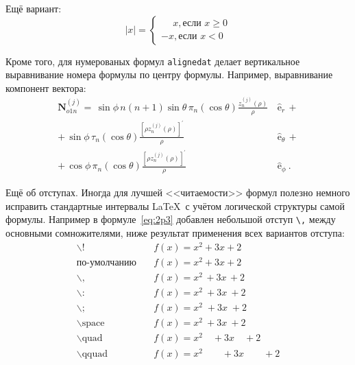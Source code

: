 Ещё вариант:
\[
    |x|=
    \begin{cases}
    \phantom{-}x, \text{если } x \geqslant 0 \\
    -x, \text{если } x<0
    \end{cases}
\]

Кроме того, для  нумерованых формул \verb|alignedat|  делает вертикальное
выравнивание номера формулы по центру формулы. Например,  выравнивание компонент вектора:
\begin{equation}
 \label{eq:2p3}
 \begin{alignedat}{2}
{\mathbf{N}}_{o1n}^{(j)} = \,{\sin} \phi\,n\!\left(n+1\right)
         {\sin}\theta\,
         \pi_n\!\left({\cos} \theta\right)
         \frac{
               z_n^{(j)}\!\left( \rho \right)
              }{\rho}\,
           &{\boldsymbol{\hat{\mathrm e}}}_{r}\,+   \\
+\,
{\sin} \phi\,
         \tau_n\!\left({\cos} \theta\right)
         \frac{
            \left[\rho z_n^{(j)}\!\left( \rho \right)\right]^{\prime}
              }{\rho}\,
            &{\boldsymbol{\hat{\mathrm e}}}_{\theta}\,+   \\
+\,
{\cos} \phi\,
         \pi_n\!\left({\cos} \theta\right)
         \frac{
            \left[\rho z_n^{(j)}\!\left( \rho \right)\right]^{\prime}
              }{\rho}\,
            &{\boldsymbol{\hat{\mathrm e}}}_{\phi}\:.
\end{alignedat}
\end{equation}

Ещё об отступах. Иногда для лучшей <<читаемости>> формул полезно
немного исправить стандартные интервалы \LaTeX\ с учётом логической
структуры самой формулы. Например в формуле~\ref{eq:2p3} добавлен
небольшой отступ \verb+\,+ между основными сомножителями, ниже
результат применения всех вариантов отступа:
\begin{align*}
\backslash! &\quad f(x) = x^2\! +3x\! +2 \\
  \mbox{по-умолчанию} &\quad f(x) = x^2+3x+2 \\
\backslash, &\quad f(x) = x^2\, +3x\, +2 \\
\backslash{:} &\quad f(x) = x^2\: +3x\: +2 \\
\backslash; &\quad f(x) = x^2\; +3x\; +2 \\
\backslash \mbox{space} &\quad f(x) = x^2\ +3x\ +2 \\
\backslash \mbox{quad} &\quad f(x) = x^2\quad +3x\quad +2 \\
\backslash \mbox{qquad} &\quad f(x) = x^2\qquad +3x\qquad +2
\end{align*}


